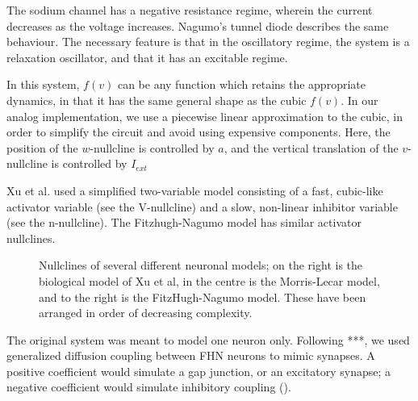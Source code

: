 \documentclass[
    11pt,
]{article}
\begin{document}
The sodium channel has a negative resistance regime, wherein the current decreases as the voltage increases.  Nagumo's tunnel diode describes the same behaviour.  The necessary feature is that in the oscillatory regime, the system is a relaxation oscillator, and that it has an excitable regime.

In this system, $f(v)$ can be any function which retains the appropriate dynamics, in that it has the same general shape as the cubic $f(v)$.  In our analog implementation, we use a piecewise linear approximation to the cubic, in order to simplify the circuit and avoid using expensive components.  Here, the position of the $w$-nullcline is controlled by $a$, and the vertical translation of the $v$-nullcline is controlled by $I_{ext}$

Xu et al. used a simplified two-variable model consisting of a fast, cubic-like activator variable (see the V-nullcline) and a slow, non-linear inhibitor variable (see the n-nullcline). The Fitzhugh-Nagumo model has similar activator nullclines.

\begin{figure}[h!]
    \label{fig: nm nullclines}
    \centering
    \caption{Nullclines of several different neuronal models; on the right is the biological model of Xu et al, in the centre is the Morris-Lecar model, and to the right is the FitzHugh-Nagumo model.  These have been arranged in order of decreasing complexity.}
\end{figure} %

The original system was meant to model one neuron only.  Following ***, we used
generalized diffusion coupling between FHN neurons to mimic synapses.
A positive coefficient would simulate a gap junction, or
an excitatory synapse; a negative coefficient would simulate inhibitory
coupling (\citet{collins1994}).

\end{document}
